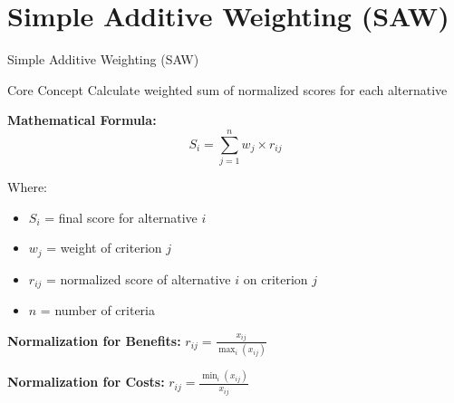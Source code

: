 \documentclass[aspectratio=169]{beamer}
\begin{document}
\section{Simple Additive Weighting (SAW)}

\begin{frame}{Simple Additive Weighting (SAW)}
\begin{block}{Core Concept}
Calculate weighted sum of normalized scores for each alternative
\end{block}

\textbf{Mathematical Formula:}
$$S_i = \sum_{j=1}^{n} w_j \times r_{ij}$$

Where:
\begin{itemize}
\item $S_i$ = final score for alternative $i$
\item $w_j$ = weight of criterion $j$
\item $r_{ij}$ = normalized score of alternative $i$ on criterion $j$
\item $n$ = number of criteria
\end{itemize}

\vspace{0.3cm}
\textbf{Normalization for Benefits:} $r_{ij} = \frac{x_{ij}}{\max_i(x_{ij})}$

\textbf{Normalization for Costs:} $r_{ij} = \frac{\min_i(x_{ij})}{x_{ij}}$
\end{frame}
\end{document}
